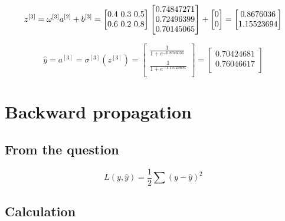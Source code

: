 \documentclass{article}
\begin{document}
\[
    z^{[3]} = \omega^{[3]} a^{[2]} + b^{[3]} = \begin{bmatrix}
        0.4 $ 0.3 $ 0.5 \\
        0.6 $ 0.2 $ 0.8 \\
    \end{bmatrix}
    \begin{bmatrix}
        0.74847271 \\
        0.72496399 \\
        0.70145065 \\
    \end{bmatrix}
    + \begin{bmatrix}
        0 \\
        0 \\
    \end{bmatrix}
    = \begin{bmatrix}
        0.8676036  \\
        1.15523694 \\
    \end{bmatrix}
\]

\[
    \widehat{y} = a^{[3]} = \sigma^{[3]}(z^{[3]}) = \begin{bmatrix}
        \frac{1}{1+e^{-0.8676036}}  \\
        \frac{1}{1+e^{-1.15523694}} \\
    \end{bmatrix}
    = \begin{bmatrix}
        0.70424681 \\
        0.76046617 \\
    \end{bmatrix}
\]

\section{Backward propagation}

\subsection{From the question}

\[
    L(y, \widehat{y})=\frac{1}{2}\sum(y-\widehat{y})^2
\]

\subsection{Calculation}
\end{document}
